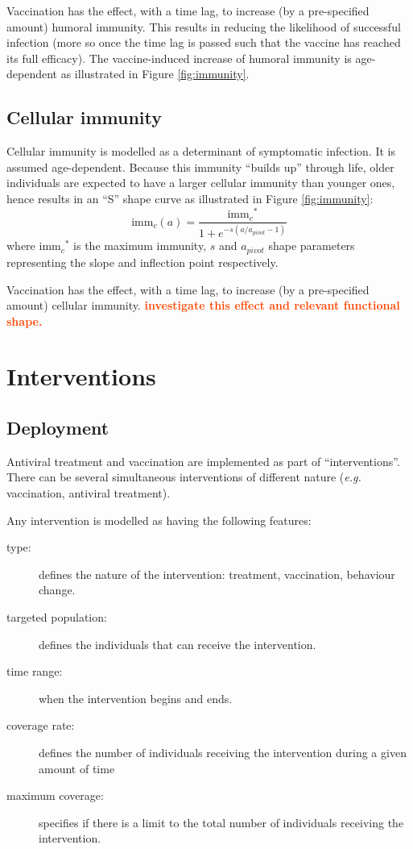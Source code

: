 \documentclass[11pt, onecolumn]{article}
\newcommand{\warning}[1]{\textbf{\textcolor{OrangeRed}{#1}}}
\newcommand{\eg}{\textit{e.g.}\xspace}
\newcommand{\immc}{\ensuremath{\text{imm}_c}}
\begin{document}
Vaccination has the effect, with a time lag, to increase (by a pre-specified amount) humoral immunity. This results in reducing the likelihood of successful infection (more so once the time lag is passed such that the vaccine has reached its full efficacy). The vaccine-induced increase of humoral immunity is age-dependent as illustrated in Figure \ref{fig:immunity}. 

\subsection{Cellular immunity}	

Cellular immunity is modelled as a determinant of symptomatic infection. It is assumed age-dependent. Because this immunity ``builds up'' through life, older individuals are expected to have a larger cellular immunity than younger ones, hence results in an ``S'' shape curve as illustrated in Figure \ref{fig:immunity}:
\begin{equation}
\immc(a) = \frac{\immc^*}{1+e^{-s(a/a_{pivot} -1)}}
\end{equation}
where $\immc^*$ is the maximum immunity, $s$ and $a_{pivot}$ shape parameters representing the slope and inflection point respectively.

Vaccination has the effect, with a time lag, to increase (by a pre-specified amount) cellular immunity. \warning{investigate this effect and relevant functional shape.}

\section{Interventions}

\subsection{Deployment}

Antiviral treatment and vaccination are implemented as part of ``interventions''. There can be several simultaneous interventions of different nature (\eg vaccination, antiviral treatment).

Any intervention is modelled as having the following features:
\begin{description}
\item[type: ] defines the nature of the intervention: treatment, vaccination, behaviour change.
\item[targeted population:] defines the individuals that can receive the intervention.
\item[time range:] when the intervention begins and ends.
\item[coverage rate:] defines the number of individuals receiving the intervention during a given amount of time
\item[maximum coverage:] specifies if there is a limit to the total number of individuals receiving the intervention.
\end{description}
 
\end{document}
